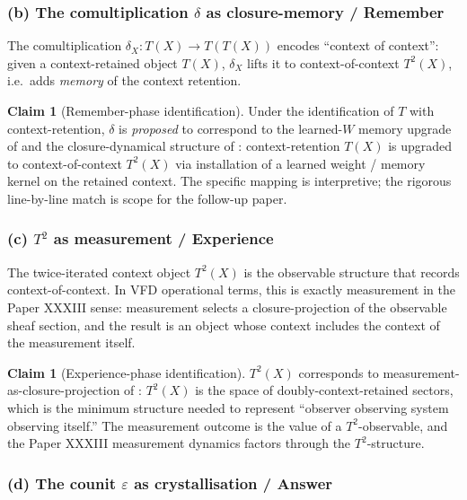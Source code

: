 \documentclass[11pt, a4paper]{amsart}
\theoremstyle{definition}
\newtheorem{claim}[theorem]{Claim}
\begin{document}
\subsubsection*{(b) The comultiplication $\delta$ as
  closure-memory / Remember}

The comultiplication $\delta_X \colon T(X) \to T(T(X))$ encodes
``context of context'': given a context-retained object $T(X)$,
$\delta_X$ lifts it to context-of-context $T^2(X)$, i.e.\ adds
\emph{memory} of the context retention.

\begin{claim}[Remember-phase identification]
\label{claim:delta-memory}
Under the identification of $T$ with context-retention, $\delta$
is \emph{proposed} to correspond to the learned-$W$ memory
upgrade of \cite{ACT-L1} and the closure-dynamical structure of
\cite{PaperXXI}: context-retention $T(X)$ is upgraded to
context-of-context $T^2(X)$ via installation of a learned
weight / memory kernel on the retained context. The specific
mapping is interpretive; the rigorous line-by-line match is
scope for the follow-up paper.
\end{claim}

\subsubsection*{(c) $T^2$ as measurement / Experience}

The twice-iterated context object $T^2(X)$ is the observable
structure that records context-of-context. In VFD operational
terms, this is exactly measurement in the Paper XXXIII sense:
measurement selects a closure-projection of the observable
sheaf section, and the result is an object whose context
includes the context of the measurement itself.

\begin{claim}[Experience-phase identification]
\label{claim:T2-measurement}
$T^2(X)$ corresponds to measurement-as-closure-projection of
\cite{PaperXXXIII}: $T^2(X)$ is the space of
doubly-context-retained sectors, which is the minimum structure
needed to represent ``observer observing system observing
itself.'' The measurement outcome is the value of a
$T^2$-observable, and the Paper XXXIII measurement dynamics
factors through the $T^2$-structure.
\end{claim}

\subsubsection*{(d) The counit $\varepsilon$ as crystallisation /
  Answer}
\end{document}
